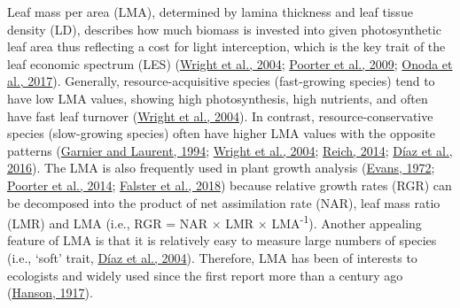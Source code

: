 \documentclass[
  12pt,
  a4paper,
,tablecaptionabove
]{scrartcl}
\begin{document}
Leaf mass per area (LMA), determined by lamina thickness and leaf tissue
density (LD), describes how much biomass is invested into given
photosynthetic leaf area thus reflecting a cost for light interception,
which is the key trait of the leaf economic spectrum (LES)
(\protect\hyperlink{ref-Wright2004a}{Wright et al., 2004};
\protect\hyperlink{ref-Poorter2009}{Poorter et al., 2009};
\protect\hyperlink{ref-Onoda2017}{Onoda et al., 2017}). Generally,
resource-acquisitive species (fast-growing species) tend to have low LMA
values, showing high photosynthesis, high nutrients, and often have fast
leaf turnover (\protect\hyperlink{ref-Wright2004a}{Wright et al.,
2004}). In contrast, resource-conservative species (slow-growing
species) often have higher LMA values with the opposite patterns
(\protect\hyperlink{ref-Garnier1994}{Garnier and Laurent, 1994};
\protect\hyperlink{ref-Wright2004a}{Wright et al., 2004};
\protect\hyperlink{ref-Reich2014}{Reich, 2014};
\protect\hyperlink{ref-Diaz2016}{Díaz et al., 2016}). The LMA is also
frequently used in plant growth analysis
(\protect\hyperlink{ref-Evans1972}{Evans, 1972};
\protect\hyperlink{ref-Poorter2014}{Poorter et al., 2014};
\protect\hyperlink{ref-Falster2018}{Falster et al., 2018}) because
relative growth rates (RGR) can be decomposed into the product of net
assimilation rate (NAR), leaf mass ratio (LMR) and LMA (i.e., RGR = NAR
\(\times\) LMR \(\times\) LMA\textsuperscript{-1}). Another appealing
feature of LMA is that it is relatively easy to measure large numbers of
species (i.e., `soft' trait, \protect\hyperlink{ref-Diaz2004}{Díaz et
al., 2004}). Therefore, LMA has been of interests to ecologists and
widely used since the first report more than a century ago
(\protect\hyperlink{ref-Hanson1917}{Hanson, 1917}).
\end{document}
